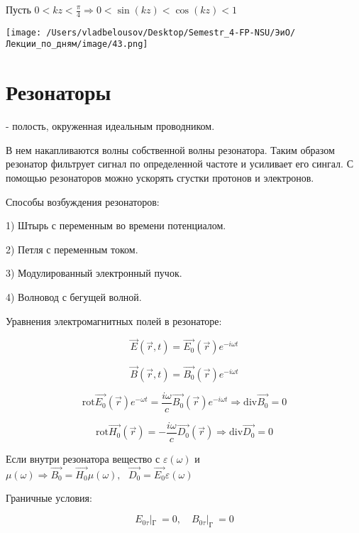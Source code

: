 \documentclass[12pt, a4paper]{report}
\begin{document}
\fi


Пусть \(\displaystyle  0 < kz < \frac{\pi}{4}   \Rightarrow 0 < \sin (kz ) < \cos (kz ) < 1 \) 

\begin{center}
    \texttt{[image: /Users/vladbelousov/Desktop/Semestr\_4-FP-NSU/ЭиО/Лекции\_по\_дням/image/43.png]}
\end{center}

\section{Резонаторы}

- полость, окруженная идеальным проводником. 

В нем накапливаются волны собственной волны резонатора. Таким образом резонатор фильтрует сигнал по определенной частоте и усиливает его сингал. С помощью резонаторов можно ускорять сгустки протонов и электронов.


Способы возбуждения резонаторов: 

1) Штырь с переменным во времени потенциалом. 

2) Петля с переменным током. 

3) Модулированный электронный пучок. 

4) Волновод с бегущей волной. 

Уравнения электромагнитных полей в резонаторе:

\[ \vec{ E } (\vec{r } , t ) = \vec{E_0  }(\vec{r } ) e^{ - i \omega t }   \] 

\[ \vec{B }  (\vec{r } , t )    = \vec{B_0 }(\vec{r } ) e^{ - i \omega t }  \] 

\[ \mathrm{rot } \vec{E_0 }(\vec{r } ) e ^{ - \omega t } = \frac{i \omega }{c } \vec{B_0 }(\vec{r } ) e^{ -i \omega t}  \Rightarrow \mathrm{div } \vec{B_0 } = 0        \] 

\[ \mathrm{rot } \vec{H_0 }(\vec{r }  ) = - \frac{i \omega }{c } \vec{D_0 }(\vec{r} )  \Rightarrow  \mathrm{div } \vec{D_0  } = 0      \] 

Если внутри резонатора вещество с \( \varepsilon ( \omega ) \) и \( \mu ( \omega ) \Rightarrow \vec{B_0 } = \vec{H_0 } \mu(\omega) ,\text{ }  \vec{D_0 } = \vec{E_0 } \varepsilon ( \omega )   \)   


Граничные условия: 

\[ E_{0 \tau} |_{\text{Г } }  = 0, \quad  B_{0 \tau} |_{\text{Г } }  = 0  \] 
\end{document}
